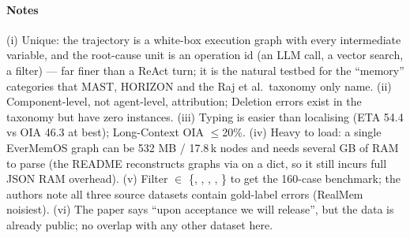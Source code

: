 \paragraph{Notes} (i) Unique: the trajectory is a white-box execution graph with every intermediate variable, and the root-cause unit is an operation id (an LLM call, a vector search, a filter) --- far finer than a ReAct turn; it is the natural testbed for the ``memory'' categories that MAST, HORIZON and the Raj et al.\ taxonomy only name. (ii) Component-level, not agent-level, attribution; Deletion errors exist in the taxonomy but have zero instances. (iii) Typing is easier than localising (ETA 54.4 vs OIA 46.3 at best); Long-Context OIA $\le$20\%. (iv) Heavy to load: a single EverMemOS graph can be 532 MB / 17.8\,k nodes and needs several GB of RAM to parse (the README reconstructs graphs via  on a  dict, so it still incurs full JSON RAM overhead). (v) Filter  $\in$ \{, , , , \} to get the 160-case benchmark; the authors note all three source datasets contain gold-label errors (RealMem noisiest). (vi) The paper says ``upon acceptance we will release'', but the data is already public; no overlap with any other dataset here.
